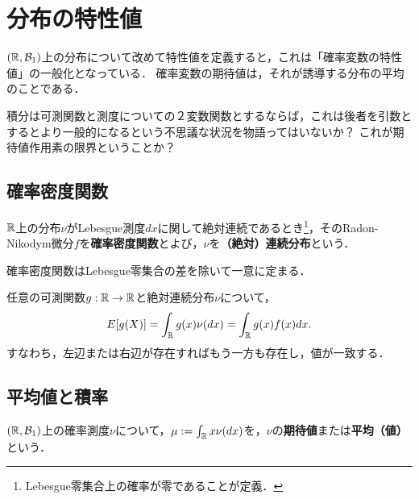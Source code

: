 \documentclass[uplatex,dvipdfmx]{jsreport}
\begin{document}
\section{分布の特性値}

\begin{tcolorbox}[colframe=ForestGreen, colback=ForestGreen!10!white,breakable,colbacktitle=ForestGreen!40!white,coltitle=black,fonttitle=\bfseries\sffamily,
title=測度論による確率の特徴量の理解]
    $(\mathbb{R},\mathcal{B}_1)$上の分布について改めて特性値を定義すると，これは「確率変数の特性値」の一般化となっている．
    確率変数の期待値は，それが誘導する分布の平均のことである．

    積分は可測関数と測度についての２変数関数とするならば，これは後者を引数とするとより一般的になるという不思議な状況を物語ってはいないか？
    これが期待値作用素の限界ということか？
\end{tcolorbox}

\subsection{確率密度関数}

\begin{definition}
    $\mathbb{R}$上の分布$\nu$がLebesgue測度$dx$に関して絶対連続であるとき\footnote{Lebesgue零集合上の確率が零であることが定義．}，そのRadon-Nikodym微分$f$を\textbf{確率密度関数}とよび，$\nu$を\textbf{（絶対）連続分布}という．
\end{definition}
\begin{remark}
    確率密度関数はLebesgue零集合の差を除いて一意に定まる．
\end{remark}

\begin{lemma}
    任意の可測関数$g:\mathbb{R}\to\mathbb{R}$と絶対連続分布$\nu$について，
    \[E[g(X)]=\int_{\mathbb{R}} g(x)\nu(dx)=\int_{\mathbb{R}} g(x)f(x)dx.\]
    すなわち，左辺または右辺が存在すればもう一方も存在し，値が一致する．
\end{lemma}

\subsection{平均値と積率}

\begin{definition}[expectation]
    $(\mathbb{R},\mathcal{B}_1)$上の確率測度$\nu$について，$\mu:=\int_{\mathbb{R}} x\nu(dx)$を，$\nu$の\textbf{期待値}または\textbf{平均（値）}という．
\end{definition}
\end{document}
